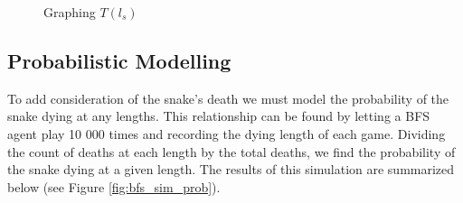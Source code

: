 \documentclass[12pt]{article}
\begin{document}
\begin{figure}[!h]
\centering
	\caption{Graphing $T(l_s)$}
	\label{fig:T_l_prelim_graph}
\end{figure}

\subsection{Probabilistic Modelling}

To add consideration of the snake's death we must model the probability of the snake dying at any lengths. This relationship can be found by letting a BFS agent play 10 000 times and recording the dying length of each game. Dividing the count of deaths at each length by the total deaths, we find the probability of the snake dying at a given length. The results of this simulation are summarized below (see Figure \ref{fig:bfs_sim_prob}).
\end{document}

